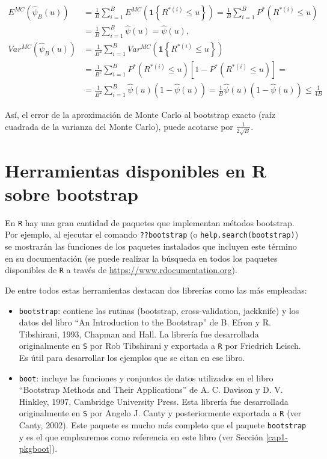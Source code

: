 \documentclass[
]{book}
\theoremstyle{definition}
\theoremstyle{definition}
\theoremstyle{definition}
\theoremstyle{remark}
\begin{document}
\[\begin{aligned}
E^{MC}\left( \hat{\psi}_{B}\left( u \right) \right) &= \frac{1}{B}
\sum_{i=1}^{B}E^{MC}\left( \mathbf{1}\left\{ R^{\ast (i)}\leq
u\right\} \right) =\frac{1}{B}\sum_{i=1}^{B}P^{\ast}\left( R^{\ast \left(
i \right)}\leq u \right) \\
&= \frac{1}{B}\sum_{i=1}^{B}\hat{\psi}\left( u \right) =\hat{\psi}\left(
u \right), \\
Var^{MC}\left( \hat{\psi}_{B}\left( u \right) \right) &= \frac{1}{B^2}
\sum_{i=1}^{B}Var^{MC}\left( \mathbf{1}\left\{ R^{\ast (i)}\leq
u\right\} \right) \\
&= \frac{1}{B^2}\sum_{i=1}^{B}P^{\ast}\left( R^{\ast (i)
}\leq u \right) \left[ 1-P^{\ast}\left( R^{\ast (i)}\leq
u \right) \right] = \\
&= \frac{1}{B^2}\sum_{i=1}^{B}\hat{\psi}\left( u \right) \left( 1-\hat{\psi}
\left( u \right) \right) =\frac{1}{B}\hat{\psi}\left( u \right) \left( 1-\hat{
\psi}\left( u \right) \right) \leq \frac{1}{4B}
\end{aligned}\]

Así, el error de la aproximación de Monte Carlo al bootstrap exacto
(raíz cuadrada de la varianza del Monte Carlo), puede acotarse por
\(\frac{1}{2\sqrt{B}}\).

\hypertarget{cap1-paquetes}{%
\section{Herramientas disponibles en R sobre bootstrap}\label{cap1-paquetes}}

En \texttt{R} hay una gran cantidad de paquetes que implementan métodos bootstrap.
Por ejemplo, al ejecutar el comando \texttt{??bootstrap} (o \texttt{help.search(\textquotesingle{}bootstrap\textquotesingle{})})
se mostrarán las funciones de los paquetes instalados que incluyen este término
en su documentación (se puede realizar la búsqueda en todos los paquetes disponibles
de \texttt{R} a través de \url{https://www.rdocumentation.org}).

De entre todos estas herramientas destacan dos librerías
como las más empleadas:

\begin{itemize}
\item
  \texttt{bootstrap}: contiene las rutinas (bootstrap, cross-validation,
  jackknife) y los datos del libro ``An Introduction to the Bootstrap'' de B.
  Efron y R. Tibshirani, 1993, Chapman and Hall. La librería fue
  desarrollada originalmente en \texttt{S} por Rob Tibshirani y exportada a \texttt{R} por
  Friedrich Leisch. Es útil para desarrollar los ejemplos que se citan en
  ese libro.
\item
  \texttt{boot}: incluye las funciones y conjuntos de datos utilizados en el libro
  ``Bootstrap Methods and Their Applications'' de A. C. Davison y D. V. Hinkley, 1997,
  Cambridge University Press. Esta librería fue desarrollada originalmente
  en \texttt{S} por Angelo J. Canty y posteriormente exportada a \texttt{R} (ver Canty, 2002).
  Este paquete es mucho más completo que el paquete \texttt{bootstrap}
  y es el que emplearemos como referencia en este libro
  (ver Sección \ref{cap1-pkgboot}).
\end{itemize}
\end{document}
